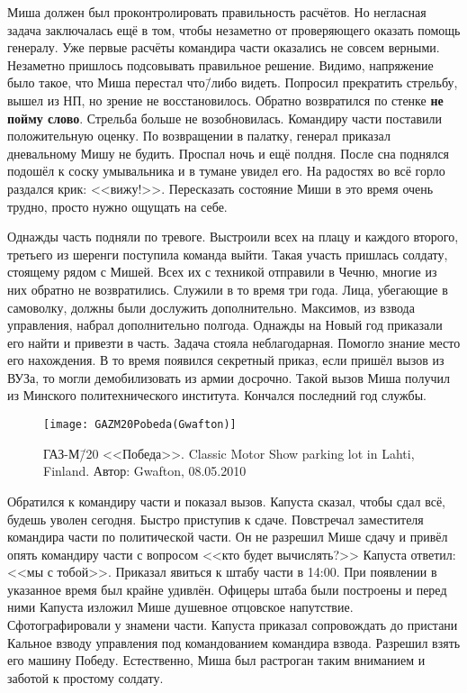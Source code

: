 Миша должен был проконтролировать правильность расчётов. Но негласная задача заключалась ещё в том, чтобы незаметно от проверяющего оказать помощь генералу. Уже первые расчёты командира части оказались не совсем верными. Незаметно пришлось подсовывать правильное решение. Видимо, напряжение было такое, что Миша перестал что\=/либо видеть. Попросил прекратить стрельбу, вышел из НП, но зрение не восстановилось. Обратно возвратился по стенке \textbf{не пойму слово}. Стрельба больше не возобновилась. Командиру части поставили положительную оценку. По возвращении в палатку, генерал приказал дневальному Мишу не будить. Проспал ночь и ещё полдня. После сна поднялся подошёл к соску умывальника и в тумане увидел его. На радостях во всё горло раздался крик: <<вижу!>>. Пересказать состояние Миши в это время очень трудно, просто нужно ощущать на себе.

Однажды часть подняли по тревоге. Выстроили всех на плацу и каждого второго, третьего из шеренги поступила команда выйти. Такая участь пришлась солдату, стоящему рядом с Мишей. Всех их с техникой отправили в Чечню, многие из них обратно не возвратились. Служили в то время три года. Лица, убегающие в самоволку, должны были дослужить дополнительно. Максимов, из взвода управления, набрал дополнительно полгода. Однажды на Новый год приказали его найти и привезти в часть. Задача стояла неблагодарная. Помогло знание место его нахождения. В то время появился секретный приказ, если пришёл вызов из ВУЗа, то могли демобилизовать из армии досрочно. Такой вызов Миша получил из Минского политехнического института. Кончался последний год службы.

\begin{wrapfigure}{O}{.4\textwidth}
\centering
\texttt{[image: GAZM20Pobeda(Gwafton)]}
\caption{ГАЗ-М\=/20 <<Победа>>. Classic Motor Show parking lot in Lahti, Finland. Автор: Gwafton, 08.05.2010}
\label{fig:GAZM20Pobeda(Gwafton)}
\end{wrapfigure}

Обратился к командиру части и показал вызов. Капуста сказал, чтобы сдал всё, будешь уволен сегодня. Быстро приступив к сдаче. Повстречал заместителя командира части по политической части. Он не разрешил Мише сдачу и привёл опять командиру части с вопросом <<кто будет вычислять?>> Капуста ответил: <<мы с тобой>>. Приказал явиться к штабу части в 14:00. При появлении в указанное время был крайне удивлён. Офицеры штаба были построены и перед ними Капуста изложил Мише душевное отцовское напутствие. Сфотографировали у знамени части. Капуста приказал сопровождать до пристани Кальное взводу управления под командованием командира взвода. Разрешил взять его машину Победу. Естественно, Миша был растроган таким вниманием и заботой к простому солдату. 

